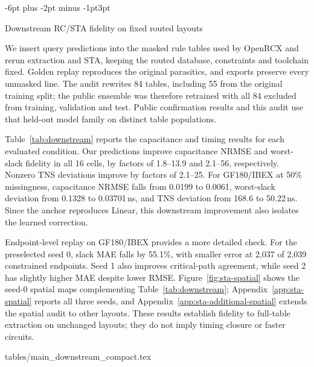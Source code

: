 \documentclass{article}
\makeatletter
\renewcommand{\subsection}{\@startsection{subsection}{2}{\z@}
  {-6pt plus -2pt minus -1pt}{3pt}{\normalsize\sc\raggedright}}
\newcommand{\tabdir}{tables}
\newcommand{\tableinput}[1]{\@@input \tabdir/#1 }
\makeatother
\begin{document}
\subsection{Downstream RC/STA fidelity on fixed routed layouts}
\label{sec:downstream}





We insert query predictions into the masked rule tables used by OpenRCX and
rerun extraction and STA,
keeping the routed database, constraints and toolchain fixed. Golden replay
reproduces the original parasitics, and exports preserve every unmasked line.
The audit rewrites 84 tables, including 55 from the original training split;
the public ensemble was therefore retrained with all 84 excluded from
training, validation and test. Public confirmation results and this audit
use that held-out model family on distinct table populations.

Table~\ref{tab:downstream} reports the capacitance and timing results for
each evaluated condition. Our predictions improve capacitance NRMSE and worst-slack fidelity
in all 16 cells, by factors of 1.8--13.9 and 2.1--56, respectively.
Nonzero TNS deviations improve by factors of 2.1--25.
For GF180/IBEX at 50\% missingness, capacitance NRMSE falls from 0.0199 to
0.0061, worst-slack deviation from 0.1328 to 0.03701\,ns, and TNS deviation
from 168.6 to 50.22\,ns. Since the anchor reproduces Linear, this downstream
improvement also isolates the learned correction.

Endpoint-level replay on GF180/IBEX provides a more detailed check.
For the preselected seed 0, slack MAE falls by 55.1\%, with smaller error
at 2,037 of 2,039 constrained endpoints. Seed 1 also improves critical-path
agreement, while seed 2 has slightly higher MAE despite lower RMSE.
Figure~\ref{fig:sta-spatial} shows the seed-0 spatial maps complementing
Table~\ref{tab:downstream}; Appendix~\ref{app:sta-spatial} reports all three seeds,
and Appendix~\ref{app:sta-additional-spatial} extends the spatial audit to other layouts.
These results establish fidelity to full-table extraction on unchanged layouts;
they do not imply timing closure or faster circuits.

\newpage
\linespread{0.96}\selectfont
\begin{table}[H]
\centering
\caption{\textbf{Downstream capacitance and timing fidelity.}
Errors against full-table extraction; WS/TNS: maximum absolute deviation
across three seeds. Bold: lower error.}
\label{tab:downstream}\label{tab:downstream_detail}\label{tab:downstream_matrix}\label{tab:downstream_matrix2}
\tableinput{main_downstream_compact.tex}
\end{table}
\end{document}
